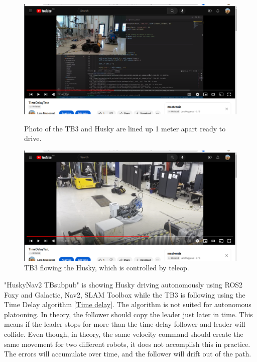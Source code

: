 \begin{figure}[H]
  \centering
  \begin{minipage}[b]{0.5\textwidth}
    \includegraphics[width=\textwidth]{Figures/YouTube/TimeDelayTest.png}
    \caption{Photo of the TB3 and Husky are lined up 1 meter apart ready to drive.}
    \label{fig:TB w Nav2 1.png}
  \end{minipage}
  \hfill
  \begin{minipage}[b]{0.49\textwidth}
    \includegraphics[width=\textwidth]{Figures/YouTube/TimeDelayTest_2.png}
    \caption{TB3 flowing the Husky, which is controlled by teleop.}
    \label{fig:TB w Nav2 2}
  \end{minipage}
\end{figure}

    
"HuskyNav2 TBsubpub" \label{HuskyNav2 TBsubpub} is showing Husky driving autonomously using ROS2 Foxy and Galactic, Nav2, SLAM Toolbox while the TB3 is following using the Time Delay algorithm \ref{Time delay}. The algorithm is not suited for autonomous platooning. In theory, the follower should copy the leader just later in time. This means if the leader stops for more than the time delay follower and leader will collide. Even though, in theory, the same velocity command should create the same movement for two different robots, it does not accomplish this in practice. The errors will accumulate over time, and the follower will drift out of the path. 


